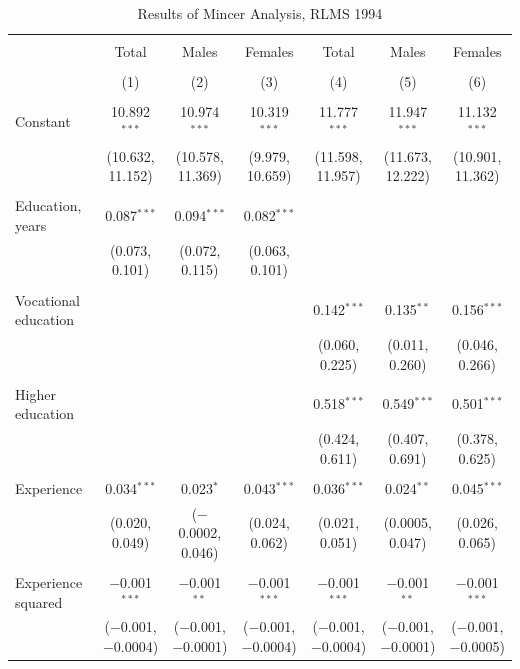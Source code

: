 \documentclass[12pt,a4paper]{article}
\numberwithin{equation}{section}
\begin{document}
\begin{landscape}
	
	\fontsize{9}{11}
	\selectfont
	
	\begin{table}[!htbp] \centering 
		\caption{Results of Mincer Analysis, RLMS 1994} 
		\label{} 
		\begin{tabular}{@{\extracolsep{5pt}}lcccccc} 
			\\[-1.8ex]\hline 
			\hline \\[-1.8ex] 
			& Total & Males & Females & Total & Males & Females \\ 
			\\[-1.8ex] & (1) & (2) & (3) & (4) & (5) & (6)\\ 
			\hline \\[-1.8ex] 
			Constant & 10.892$^{***}$ & 10.974$^{***}$ & 10.319$^{***}$ & 11.777$^{***}$ & 11.947$^{***}$ & 11.132$^{***}$ \\ 
			& (10.632, 11.152) & (10.578, 11.369) & (9.979, 10.659) & (11.598, 11.957) & (11.673, 12.222) & (10.901, 11.362) \\ 
			& & & & & & \\ 
			Education, years & 0.087$^{***}$ & 0.094$^{***}$ & 0.082$^{***}$ &  &  &  \\ 
			& (0.073, 0.101) & (0.072, 0.115) & (0.063, 0.101) &  &  &  \\ 
			& & & & & & \\ 
			Vocational education &  &  &  & 0.142$^{***}$ & 0.135$^{**}$ & 0.156$^{***}$ \\ 
			&  &  &  & (0.060, 0.225) & (0.011, 0.260) & (0.046, 0.266) \\ 
			& & & & & & \\ 
			Higher education &  &  &  & 0.518$^{***}$ & 0.549$^{***}$ & 0.501$^{***}$ \\ 
			&  &  &  & (0.424, 0.611) & (0.407, 0.691) & (0.378, 0.625) \\ 
			& & & & & & \\ 
			Experience & 0.034$^{***}$ & 0.023$^{*}$ & 0.043$^{***}$ & 0.036$^{***}$ & 0.024$^{**}$ & 0.045$^{***}$ \\ 
			& (0.020, 0.049) & ($-$0.0002, 0.046) & (0.024, 0.062) & (0.021, 0.051) & (0.0005, 0.047) & (0.026, 0.065) \\ 
			& & & & & & \\ 
			Experience squared & $-$0.001$^{***}$ & $-$0.001$^{**}$ & $-$0.001$^{***}$ & $-$0.001$^{***}$ & $-$0.001$^{**}$ & $-$0.001$^{***}$ \\ 
			& ($-$0.001, $-$0.0004) & ($-$0.001, $-$0.0001) & ($-$0.001, $-$0.0004) & ($-$0.001, $-$0.0004) & ($-$0.001, $-$0.0001) & ($-$0.001, $-$0.0005) \\ 

\end{tabular}
\end{table}
\end{landscape}
\end{document}
